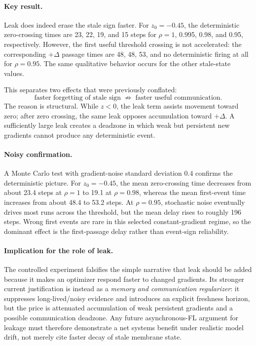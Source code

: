 \paragraph{Key result.}
Leak does indeed erase the stale sign faster. For $z_0=-0.45$, the deterministic zero-crossing times are 23, 22, 19, and 15 steps for $\rho=1$, 0.995, 0.98, and 0.95, respectively. However, the first useful threshold crossing is not accelerated: the corresponding $+\Delta$ passage times are 48, 48, 53, and no deterministic firing at all for $\rho=0.95$. The same qualitative behavior occurs for the other stale-state values.

This separates two effects that were previously conflated:
\begin{equation}
  \boxed{\text{faster forgetting of stale sign}\;\not\Rightarrow\;\text{faster useful communication}.}
\end{equation}
The reason is structural. While $z<0$, the leak term assists movement toward zero; after zero crossing, the same leak opposes accumulation toward $+\Delta$. A sufficiently large leak creates a deadzone in which weak but persistent new gradients cannot produce any deterministic event.

\paragraph{Noisy confirmation.}
A Monte Carlo test with gradient-noise standard deviation 0.4 confirms the deterministic picture. For $z_0=-0.45$, the mean zero-crossing time decreases from about 23.4 steps at $\rho=1$ to 19.1 at $\rho=0.98$, whereas the mean first-event time increases from about 48.4 to 53.2 steps. At $\rho=0.95$, stochastic noise eventually drives most runs across the threshold, but the mean delay rises to roughly 196 steps. Wrong first events are rare in this selected constant-gradient regime, so the dominant effect is the first-passage delay rather than event-sign reliability.

\paragraph{Implication for the role of leak.}
The controlled experiment falsifies the simple narrative that leak should be added because it makes an optimizer respond faster to changed gradients. Its stronger current justification is instead as a \emph{memory and communication regularizer}: it suppresses long-lived/noisy evidence and introduces an explicit freshness horizon, but the price is attenuated accumulation of weak persistent gradients and a possible communication deadzone. Any future asynchronous-FL argument for leakage must therefore demonstrate a net systems benefit under realistic model drift, not merely cite faster decay of stale membrane state.

